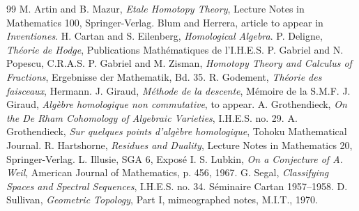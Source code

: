 \documentclass[11pt]{article}
\begin{document}
\begin{thebibliography}{99}
 M. Artin and B. Mazur, \emph{Etale Homotopy Theory}, Lecture Notes in Mathematics 100, Springer-Verlag.
 Blum and Herrera, article to appear in \emph{Inventiones}.
 H. Cartan and S. Eilenberg, \emph{Homological Algebra}.
 P. Deligne, \emph{Th\'eorie de Hodge}, Publications Math\'ematiques de l'I.H.E.S.
 P. Gabriel and N. Popescu, C.R.A.S.
 P. Gabriel and M. Zisman, \emph{Homotopy Theory and Calculus of Fractions}, Ergebnisse der Mathematik, Bd. 35.
 R. Godement, \emph{Th\'eorie des faisceaux}, Hermann.
 J. Giraud, \emph{M\'ethode de la descente}, M\'emoire de la S.M.F.
 J. Giraud, \emph{Alg\`ebre homologique non commutative}, to appear.
 A. Grothendieck, \emph{On the De Rham Cohomology of Algebraic Varieties}, I.H.E.S. no. 29.
 A. Grothendieck, \emph{Sur quelques points d'alg\`ebre homologique}, Tohoku Mathematical Journal.
 R. Hartshorne, \emph{Residues and Duality}, Lecture Notes in Mathematics 20, Springer-Verlag.
 L. Illusie, SGA 6, Expos\'e I.
 S. Lubkin, \emph{On a Conjecture of A. Weil}, American Journal of Mathematics, p. 456, 1967.
 G. Segal, \emph{Classifying Spaces and Spectral Sequences}, I.H.E.S. no. 34.
 S\'eminaire Cartan 1957--1958.
 D. Sullivan, \emph{Geometric Topology}, Part I, mimeographed notes, M.I.T., 1970.
\end{thebibliography}
\end{document}
